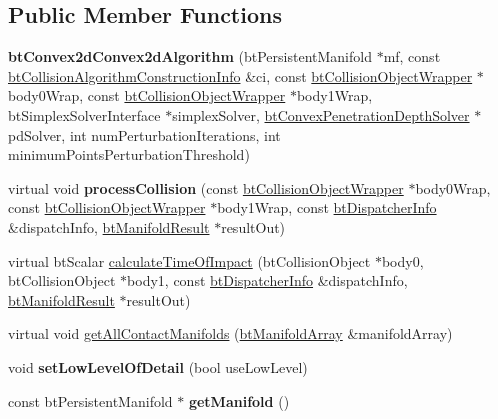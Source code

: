 \subsection*{Public Member Functions}
\begin{DoxyCompactItemize}
\item 
\hypertarget{classbt_convex2d_convex2d_algorithm_a5b8333581357811e17db88aa7380a315}{{\bfseries bt\+Convex2d\+Convex2d\+Algorithm} (bt\+Persistent\+Manifold $\ast$mf, const \hyperlink{structbt_collision_algorithm_construction_info}{bt\+Collision\+Algorithm\+Construction\+Info} \&ci, const \hyperlink{structbt_collision_object_wrapper}{bt\+Collision\+Object\+Wrapper} $\ast$body0\+Wrap, const \hyperlink{structbt_collision_object_wrapper}{bt\+Collision\+Object\+Wrapper} $\ast$body1\+Wrap, bt\+Simplex\+Solver\+Interface $\ast$simplex\+Solver, \hyperlink{classbt_convex_penetration_depth_solver}{bt\+Convex\+Penetration\+Depth\+Solver} $\ast$pd\+Solver, int num\+Perturbation\+Iterations, int minimum\+Points\+Perturbation\+Threshold)}\label{classbt_convex2d_convex2d_algorithm_a5b8333581357811e17db88aa7380a315}

\item 
\hypertarget{classbt_convex2d_convex2d_algorithm_af74b6cf73f857abc2aa6eca44be799e3}{virtual void {\bfseries process\+Collision} (const \hyperlink{structbt_collision_object_wrapper}{bt\+Collision\+Object\+Wrapper} $\ast$body0\+Wrap, const \hyperlink{structbt_collision_object_wrapper}{bt\+Collision\+Object\+Wrapper} $\ast$body1\+Wrap, const \hyperlink{structbt_dispatcher_info}{bt\+Dispatcher\+Info} \&dispatch\+Info, \hyperlink{classbt_manifold_result}{bt\+Manifold\+Result} $\ast$result\+Out)}\label{classbt_convex2d_convex2d_algorithm_af74b6cf73f857abc2aa6eca44be799e3}

\item 
virtual bt\+Scalar \hyperlink{classbt_convex2d_convex2d_algorithm_a32bf85e0246ed54dd41edd861294c37e}{calculate\+Time\+Of\+Impact} (bt\+Collision\+Object $\ast$body0, bt\+Collision\+Object $\ast$body1, const \hyperlink{structbt_dispatcher_info}{bt\+Dispatcher\+Info} \&dispatch\+Info, \hyperlink{classbt_manifold_result}{bt\+Manifold\+Result} $\ast$result\+Out)
\item 
virtual void \hyperlink{classbt_convex2d_convex2d_algorithm_ade3af2f3f04d9b202535d33550a94be4}{get\+All\+Contact\+Manifolds} (\hyperlink{classbt_aligned_object_array}{bt\+Manifold\+Array} \&manifold\+Array)
\item 
\hypertarget{classbt_convex2d_convex2d_algorithm_a287f00ab22f2a15215effc4f1f14f8a9}{void {\bfseries set\+Low\+Level\+Of\+Detail} (bool use\+Low\+Level)}\label{classbt_convex2d_convex2d_algorithm_a287f00ab22f2a15215effc4f1f14f8a9}

\item 
\hypertarget{classbt_convex2d_convex2d_algorithm_a3db358838172c32e1fd075461ace5a58}{const bt\+Persistent\+Manifold $\ast$ {\bfseries get\+Manifold} ()}\label{classbt_convex2d_convex2d_algorithm_a3db358838172c32e1fd075461ace5a58}

\end{DoxyCompactItemize}
